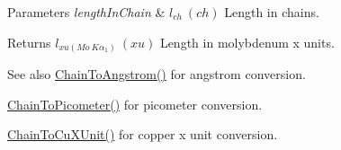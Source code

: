 \begin{DoxyParams}{Parameters}
{\em length\+In\+Chain} & $ l_{ch}\ (ch)$ Length in chains. \\
\hline
\end{DoxyParams}
\begin{DoxyReturn}{Returns}
$ l_{xu(Mo\ K\alpha_1)}\ (xu)$ Length in molybdenum x units. 
\end{DoxyReturn}
\begin{DoxySeeAlso}{See also}
\mbox{\hyperlink{group___e_g_x_math-_conversions-_length_conversions-_imperial-_chain-_non-_s_i_ga89e870762310908510aad80d26dc1942}{Chain\+To\+Angstrom()}} for angstrom conversion. 

\mbox{\hyperlink{group___e_g_x_math-_conversions-_length_conversions-_imperial-_chain-_s_i_ga27f06f3f63727a16e02afaf8f01f4b45}{Chain\+To\+Picometer()}} for picometer conversion. 

\mbox{\hyperlink{group___e_g_x_math-_conversions-_length_conversions-_imperial-_chain-_non-_s_i_ga4d49e29ef32b64b7a433ffe76447cf5f}{Chain\+To\+Cu\+X\+Unit()}} for copper x unit conversion. 
\end{DoxySeeAlso}
